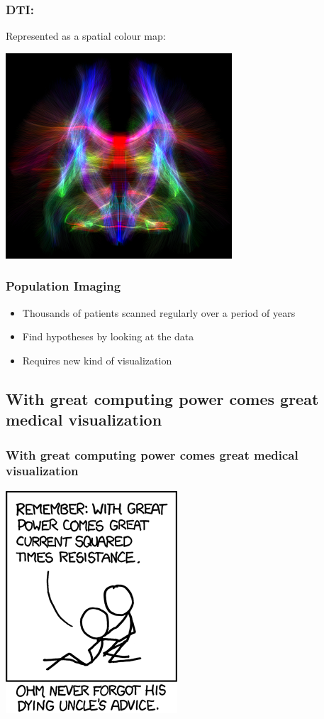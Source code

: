 \documentclass{beamer}
\begin{document}
\begin{frame}
	\frametitle{DTI:}
	Represented as a spatial colour map:
	\begin{center}
		\includegraphics[width=.6\textwidth]{images/tractography}
	\end{center}
\end{frame}

\begin{frame}
	\frametitle{Population Imaging}
	\begin{itemize}
		\item Thousands of patients scanned regularly over a period of years
		\item Find hypotheses by looking at the data
		\item Requires new kind of visualization
	\end{itemize}
\end{frame}

\subsection{With great computing power comes great medical visualization}
\begin{frame}
	\frametitle{With great computing power comes great medical visualization}
	\begin{center}
		\includegraphics[width=.4\textwidth]{images/ohm}
	\end{center}
\end{frame}
\end{document}

